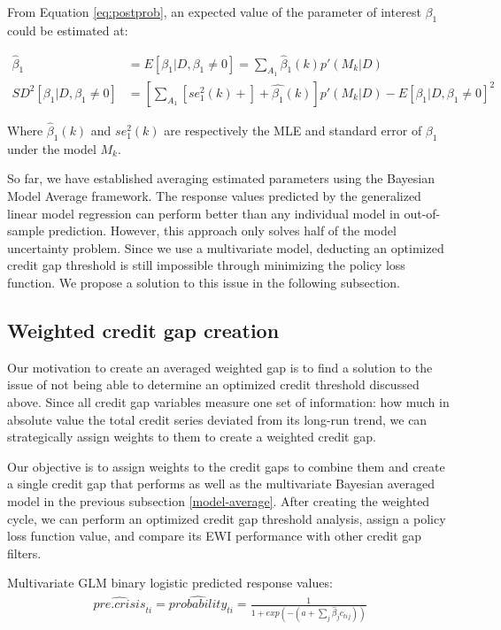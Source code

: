 \documentclass[
  12pt,
]{article}
\begin{document}
From Equation \eqref{eq:postprob}, an expected value of the parameter of interest \(\beta_1\) could be estimated at:

\begin{align}
\hat{\beta}_1 &= E[\beta_1|D, \beta_1\ne 0] = \sum\limits_{A_1} \hat{\beta}_1(k)p'(M_k|D)
\\
SD^2[\beta_1|D, \beta_1\ne 0] &=[\sum\limits_{A_1}[se_1^2(k)+]+\hat{\beta_1}(k)]p'(M_k|D)
- E[\beta_1|D, \beta_1\ne 0]^2
\end{align}

Where \(\hat{\beta}_1(k)\) and \(se_1^2(k)\) are respectively the MLE and standard error of \(\beta_1\) under the model \(M_k\).

So far, we have established averaging estimated parameters using the Bayesian Model Average framework. The response values predicted by the generalized linear model regression can perform better than any individual model in out-of-sample prediction. However, this approach only solves half of the model uncertainty problem. Since we use a multivariate model, deducting an optimized credit gap threshold is still impossible through minimizing the policy loss function. We propose a solution to this issue in the following subsection.

\hypertarget{weighted-gap-creation}{%
\subsection{Weighted credit gap creation}\label{weighted-gap-creation}}

Our motivation to create an averaged weighted gap is to find a solution to the issue of not being able to determine an optimized credit threshold discussed above. Since all credit gap variables measure one set of information: how much in absolute value the total credit series deviated from its long-run trend, we can strategically assign weights to them to create a weighted credit gap.

Our objective is to assign weights to the credit gaps to combine them and create a single credit gap that performs as well as the multivariate Bayesian averaged model in the previous subsection \ref{model-average}. After creating the weighted cycle, we can perform an optimized credit gap threshold analysis, assign a policy loss function value, and compare its EWI performance with other credit gap filters.

Multivariate GLM binary logistic predicted response values:
\begin{align} \label{eq:glmpredicteq}
\widehat{pre.crisis}_{ti} = \widehat{probability}_{ti} = \frac {1}{1+exp(-(a+\sum\nolimits_j \hat{\beta}_j c_{tij}))}
\end{align}
\end{document}
